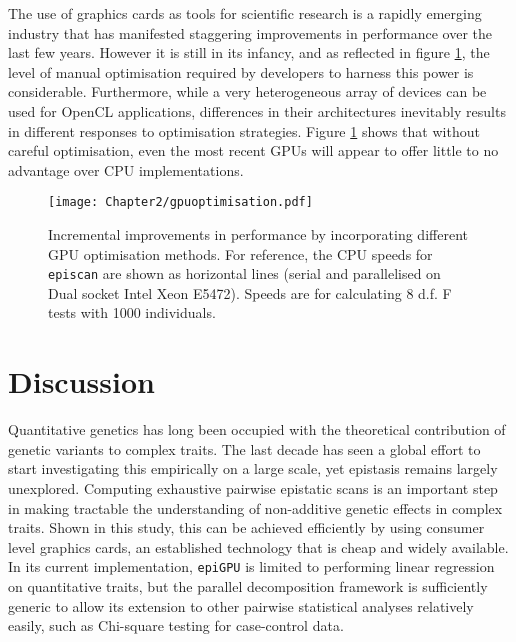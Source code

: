 The use of graphics cards as tools for scientific research is a rapidly emerging industry that has manifested staggering improvements in performance over the last few years. However it is still in its infancy, and as reflected in figure \ref{fig:gpuoptimisation}, the level of manual optimisation required by developers to harness this power is considerable. Furthermore, while a very heterogeneous array of devices can be used for OpenCL applications, differences in their architectures inevitably results in different responses to optimisation strategies. Figure \ref{fig:gpuoptimisation} shows that without careful optimisation, even the most recent GPUs will appear to offer little to no advantage over CPU implementations.

\begin{figure}
\begin{center}
\texttt{[image: Chapter2/gpuoptimisation.pdf]}
\caption[Assessment of GPU optimisation techniques]{Incremental improvements in performance by incorporating different GPU optimisation methods. For reference, the CPU speeds for {\tt episcan} are shown as horizontal lines (serial and parallelised on Dual socket Intel Xeon E5472). Speeds are for calculating 8 d.f. F tests with 1000 individuals.}
\label{fig:gpuoptimisation}
\end{center}
\end{figure}


\section{Discussion}

Quantitative genetics has long been occupied with the theoretical contribution of genetic variants to complex traits. The last decade has seen a global effort to start investigating this empirically on a large scale, yet epistasis remains largely unexplored. Computing exhaustive pairwise epistatic scans is an important step in making tractable the understanding of non-additive genetic effects in complex traits. Shown in this study, this can be achieved efficiently by using consumer level graphics cards, an established technology that is cheap and widely available. In its current implementation, {\tt epiGPU} is limited to performing linear regression on quantitative traits, but the parallel decomposition framework is sufficiently generic to allow its extension to other pairwise statistical analyses relatively easily, such as Chi-square testing for case-control data.

